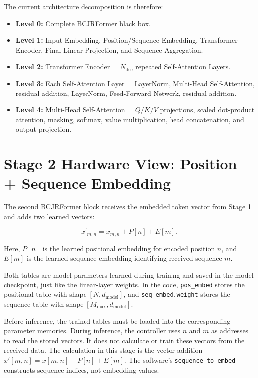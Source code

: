 \documentclass[11pt,a4paper]{article}
\begin{document}
The current architecture decomposition is therefore:

\begin{itemize}
    \item \textbf{Level 0:} Complete BCJRFormer black box.
    \item \textbf{Level 1:} Input Embedding, Position/Sequence Embedding,
    Transformer Encoder, Final Linear Projection, and Sequence Aggregation.
    \item \textbf{Level 2:} Transformer Encoder =
    $N_{\mathrm{dec}}$ repeated Self-Attention Layers.
    \item \textbf{Level 3:} Each Self-Attention Layer =
    LayerNorm, Multi-Head Self-Attention, residual addition,
    LayerNorm, Feed-Forward Network, residual addition.
    \item \textbf{Level 4:} Multi-Head Self-Attention =
    $Q/K/V$ projections, scaled dot-product attention, masking,
    softmax, value multiplication, head concatenation, and output projection.
\end{itemize}




\section{Stage 2 Hardware View: Position + Sequence Embedding}

The second BCJRFormer block receives the embedded token vector from Stage 1 and
adds two learned vectors:

\[
x'_{m,n}=x_{m,n}+P[n]+E[m].
\]

Here, $P[n]$ is the learned positional embedding for encoded position $n$, and
$E[m]$ is the learned sequence embedding identifying received sequence $m$.

Both tables are model parameters learned during training and saved in the
model checkpoint, just like the linear-layer weights. In the code,
\texttt{pos\_embed} stores the positional table with shape
$[N,d_{\mathrm{model}}]$, and \texttt{seq\_embed.weight} stores the sequence
table with shape $[M_{\max},d_{\mathrm{model}}]$.

Before inference, the trained tables must be loaded into the corresponding
parameter memories. During inference, the controller uses $n$ and $m$ as
addresses to read the stored vectors. It does not calculate or train these
vectors from the received data. The calculation in this stage is the vector
addition $x'[m,n]=x[m,n]+P[n]+E[m]$. The software's
\texttt{sequence\_to\_embed} constructs sequence indices, not embedding values.
\end{document}
